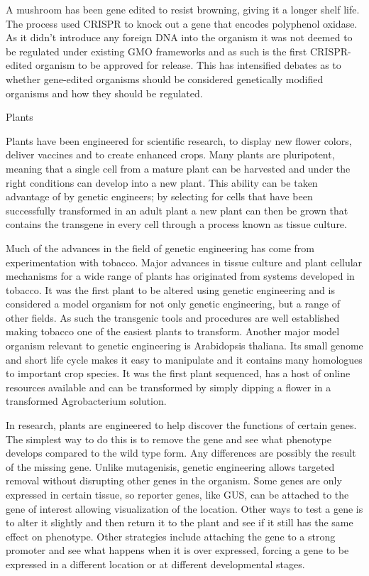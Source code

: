 A mushroom has been gene edited to resist browning, giving it a longer shelf life. The process used CRISPR to knock out a gene that encodes polyphenol oxidase. As it didn't introduce any foreign DNA into the organism it was not deemed to be regulated under existing GMO frameworks and as such is the first CRISPR-edited organism to be approved for release. This has intensified debates as to whether gene-edited organisms should be considered genetically modified organisms and how they should be regulated.

Plants

Plants have been engineered for scientific research, to display new flower colors, deliver vaccines and to create enhanced crops. Many plants are pluripotent, meaning that a single cell from a mature plant can be harvested and under the right conditions can develop into a new plant. This ability can be taken advantage of by genetic engineers; by selecting for cells that have been successfully transformed in an adult plant a new plant can then be grown that contains the transgene in every cell through a process known as tissue culture.

Much of the advances in the field of genetic engineering has come from experimentation with tobacco. Major advances in tissue culture and plant cellular mechanisms for a wide range of plants has originated from systems developed in tobacco. It was the first plant to be altered using genetic engineering and is considered a model organism for not only genetic engineering, but a range of other fields. As such the transgenic tools and procedures are well established making tobacco one of the easiest plants to transform. Another major model organism relevant to genetic engineering is Arabidopsis thaliana. Its small genome and short life cycle makes it easy to manipulate and it contains many homologues to important crop species. It was the first plant sequenced, has a host of online resources available and can be transformed by simply dipping a flower in a transformed Agrobacterium solution.

In research, plants are engineered to help discover the functions of certain genes. The simplest way to do this is to remove the gene and see what phenotype develops compared to the wild type form. Any differences are possibly the result of the missing gene. Unlike mutagenisis, genetic engineering allows targeted removal without disrupting other genes in the organism. Some genes are only expressed in certain tissue, so reporter genes, like GUS, can be attached to the gene of interest allowing visualization of the location. Other ways to test a gene is to alter it slightly and then return it to the plant and see if it still has the same effect on phenotype. Other strategies include attaching the gene to a strong promoter and see what happens when it is over expressed, forcing a gene to be expressed in a different location or at different developmental stages.

